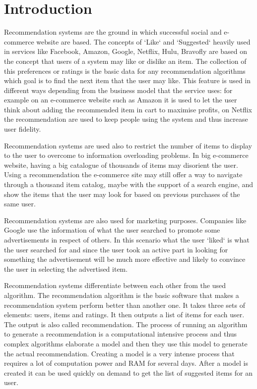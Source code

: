 \chapter{Introduction}
\label{chapter:<Introduction>}

\acresetall

Recommendation systems are the ground in which successful social and e-commerce website are based. The concepts of `Like` and `Suggested` heavily used in services like Facebook, Amazon, Google, Netflix, Hulu, Bravofly are based on the concept that users of a system may like or dislike an item. The collection of this preferences or ratings is the basic data for any recommendation algorithms which goal is to find the next item that the user may like. This feature is used in different ways depending from the business model that the service uses: for example on an e-commerce website such as Amazon it is used to let the user think about adding the recommended item in cart to maximise profits, on Netflix the recommendation are used to keep people using the system and thus increase user fidelity.

Recommendation systems are used also to restrict the number of items to display to the user to overcome to information overloading problems. In big e-commerce website, having a big catalogue of thousands of items may disorient the user. Using a recommendation the e-commerce site may still offer a way to navigate through a thousand item catalog, maybe with the support of a search engine, and show the items that the user may look for based on previous purchases of the same user.

Recommendation systems are also used for marketing purposes. Companies like Google use the information of what the user searched to promote some advertisements in respect of others. In this scenario what the user `liked` is what the user searched for and since the user took an active part in looking for something the advertisement will be much more effective and likely to convince the user in selecting the advertised item.

Recommendation systems differentiate between each other from the used algorithm. The recommendation algorithm is the basic software that makes a recommendation system perform better than another one. It takes three sets of elements: users, items and ratings. It then outputs a list of items for each user. The output is also called recommendation. The process of running an algorithm to generate a recommendation is a computational intensive process and thus complex algorithms elaborate a model and then they use this model to generate the actual recommendation. Creating a model is a very intense process that requires a lot of computation power and \ac{RAM} for several days. After a model is created it can be used quickly on demand to get the list of suggested items for an user.

